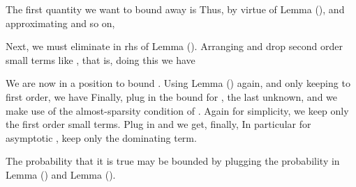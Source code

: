 The first quantity we want to bound away is
Thus, by virtue of Lemma (), and approximating  and so on,

Next, we must eliminate  in rhs of Lemma ().
Arranging and drop second order small terms like , that is,
doing this we have

We are now in a position to bound .
Using Lemma () again, and only keeping to first order, we have
Finally, plug in the bound for , the last unknown, and we make use of the almost-sparsity condition of .
Again for simplicity, we keep only the first order small terms.
Plug in  and  we get, finally,
In particular for asymptotic , keep only the dominating term.

The probability that it is true may be bounded by plugging the probability in Lemma () and Lemma ().

\stopsection

\stopchapter
